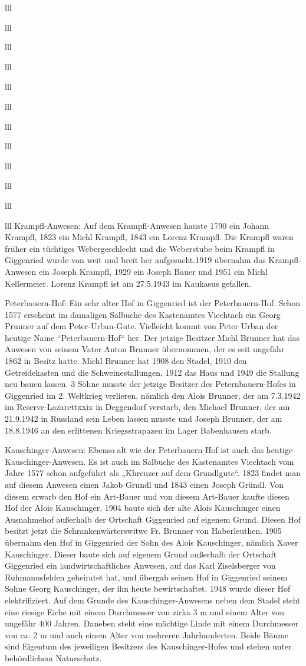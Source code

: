 \documentclass[12pt,a4pager]{book}
\begin{document}
\begin{tabuluar}{lll}
\begin{tabuluar}{lll}
\begin{tabuluar}{lll}
\begin{tabuluar}{lll}
\begin{tabuluar}{lll}
\begin{tabuluar}{lll}
\begin{tabuluar}{lll}
\begin{tabuluar}{lll}
\begin{tabuluar}{lll}
\begin{tabuluar}{lll}
\begin{tabuluar}{lll}
\begin{tabuluar}{lll}
Krampfl-Anwesen: Auf dem Krampfl-Anwesen hauste 1790 ein Johann Krampfl, 1823
ein Michl Krampfl, 1843 ein Lorenz Krampfl. Die Krampfl waren früher ein
tüchtiges Webergeschlecht und die Weberstube beim Krampfl in Giggenried wurde
von weit und breit her aufgesucht.1919 übernahm das Krampfl-Anwesen ein Joseph
Krampfl, 1929 ein Joseph Bauer und 1951 ein Michl Kellermeier. Lorenz Krampfl
ist am 27.5.1943 im Kaukasus gefallen.

Peterbauern-Hof: Ein sehr alter Hof in Giggenried ist der Peterbauern-Hof. Schon
1577 erscheint im damaligen Salbuche des Kastenamtes Viechtach ein Georg Prunner
auf dem Peter-Urban-Gute. Vielleicht kommt von Peter Urban der heutige Name
“Peterbauern-Hof“ her. Der jetzige Besitzer Michl Brunner hat das Anwesen von
seinem Vater Anton Brunner übernommen, der es seit ungefähr 1862 in Besitz
hatte. Michl Brunner hat 1908 den Stadel, 1910 den Getreidekasten und die
Schweinestallungen, 1912 das Haus und 1949 die Stallung neu bauen lassen. 3
Söhne musste der jetzige Besitzer des Peternbauern-Hofes in Giggenried im 2.
Weltkrieg verlieren, nämlich den Alois Brunner, der am 7.3.1942 im
Reserve-Lazarettxxix in Deggendorf verstarb, den Michael Brunner, der am
21.9.1942 in Russland sein Leben lassen musste und Joseph Brunner, der am
18.8.1946 an den erlittenen Kriegsstrapazen im Lager Babenhausen starb.

Kauschinger-Anwesen: Ebenso alt wie der Peterbauern-Hof ist auch das heutige
Kauschinger-Anwesen. Es ist auch im Salbuche des Kastenamtes Viechtach vom Jahre
1577 schon aufgeführt als „Khreuzer auf dem Grundlgute“. 1823 findet man auf
diesem Anwesen einen Jakob Grundl und 1843 einen Joseph Gründl. Von diesem
erwarb den Hof ein Art-Bauer und von diesem Art-Bauer kaufte diesen Hof der
Alois Kauschinger. 1904 baute sich der alte Alois Kauschinger einen Ausnahmehof
außerhalb der Ortschaft Giggenried auf eigenem Grund. Diesen Hof besitzt jetzt
die Schrankenwärterswitwe Fr. Brunner von Haberleuthen. 1905 übernahm den Hof in
Giggenried der Sohn des Alois Kauschinger, nämlich Xaver Kauschinger. Dieser
baute sich auf eigenem Grund außerhalb der Ortschaft Giggenried ein
landwirtschaftliches Anwesen, auf das Karl Ziselsberger von Ruhmannsfelden
geheiratet hat, und übergab seinen Hof in Giggenried seinem Sohne Georg
Kauschinger, der ihn heute bewirtschaftet. 1948 wurde dieser Hof elektrifiziert.
Auf dem Grunde des Kauschinger-Anwesens neben dem Stadel steht eine riesige
Eiche mit einem Durchmesser von zirka 3 m und einem Alter von ungefähr 400
Jahren. Daneben steht eine mächtige Linde mit einem Durchmesser von ca. 2 m und
auch einem Alter von mehreren Jahrhunderten. Beide Bäume sind Eigentum des
jeweiligen Besitzers des Kauschinger-Hofes und stehen unter behördlichem
Naturschutz.


\end{tabuluar}
\end{tabuluar}
\end{tabuluar}
\end{tabuluar}
\end{tabuluar}
\end{tabuluar}
\end{tabuluar}
\end{tabuluar}
\end{tabuluar}
\end{tabuluar}
\end{tabuluar}
\end{tabuluar}
\end{document}
